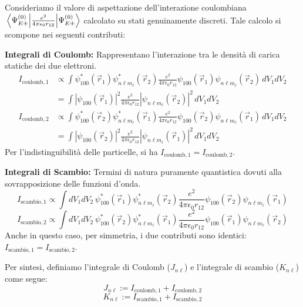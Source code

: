 Consideriamo il valore di aspettazione dell'interazione coulombiana \(\mel{\Psi_{E\pm}^{(0)}}{\frac{e^2}{4\pi\epsilon_0 r_{12}}}{\Psi_{E\pm}^{(0)}}\) calcolato su stati genuinamente discreti. Tale calcolo si scompone nei seguenti contributi:

\textbf{Integrali di Coulomb:}
Rappresentano l'interazione tra le densità di carica statiche dei due elettroni.
\begin{align}
    I_{\text{coulomb},1} &\propto \int \psi_{100}^*(\vec{r}_1) \psi_{n\ell m_\ell}^*(\vec{r}_2) \frac{e^2}{4\pi\epsilon_0 r_{12}} \psi_{100}(\vec{r}_1) \psi_{n\ell m_\ell}(\vec{r}_2) \, dV_1 dV_2 \nonumber \\
    &= \int |\psi_{100}(\vec{r}_1)|^2 \frac{e^2}{4\pi\epsilon_0 r_{12}} |\psi_{n\ell m_\ell}(\vec{r}_2)|^2 \, dV_1 dV_2
\end{align}
\begin{align}
    I_{\text{coulomb},2} &\propto \int \psi_{100}^*(\vec{r}_2) \psi_{n\ell m_\ell}^*(\vec{r}_1) \frac{e^2}{4\pi\epsilon_0 r_{12}} \psi_{100}(\vec{r}_2) \psi_{n\ell m_\ell}(\vec{r}_1) \, dV_1 dV_2 \nonumber \\
    &= \int |\psi_{100}(\vec{r}_2)|^2 \frac{e^2}{4\pi\epsilon_0 r_{12}} |\psi_{n\ell m_\ell}(\vec{r}_1)|^2 \, dV_1 dV_2
\end{align}
Per l'indistinguibilità delle particelle, si ha \(I_{\text{coulomb},1} = I_{\text{coulomb},2}\).

\textbf{Integrali di Scambio:}
Termini di natura puramente quantistica dovuti alla sovrapposizione delle funzioni d'onda.
\begin{equation}
    I_{\text{scambio},1} \propto \int dV_1 dV_2 \, \psi_{100}^*(\vec{r}_1) \psi_{n\ell m_\ell}^*(\vec{r}_2) \frac{e^2}{4\pi\epsilon_0 r_{12}} \psi_{100}(\vec{r}_2) \psi_{n\ell m_\ell}(\vec{r}_1)
\end{equation}
\begin{equation}
    I_{\text{scambio},2} \propto \int dV_1 dV_2 \, \psi_{100}^*(\vec{r}_2) \psi_{n\ell m_\ell}^*(\vec{r}_1) \frac{e^2}{4\pi\epsilon_0 r_{12}} \psi_{100}(\vec{r}_1) \psi_{n\ell m_\ell}(\vec{r}_2)
\end{equation}
Anche in questo caso, per simmetria, i due contributi sono identici: \(I_{\text{scambio},1} = I_{\text{scambio},2}\).

Per sintesi, definiamo l'integrale di Coulomb (\(J_{n\ell}\)) e l'integrale di scambio (\(K_{n\ell}\)) come segue:
\begin{equation}
    J_{n\ell} := I_{\text{coulomb},1} + I_{\text{coulomb},2}
\end{equation}
\begin{equation}
    K_{n\ell} := I_{\text{scambio},1} + I_{\text{scambio},2}
\end{equation}

